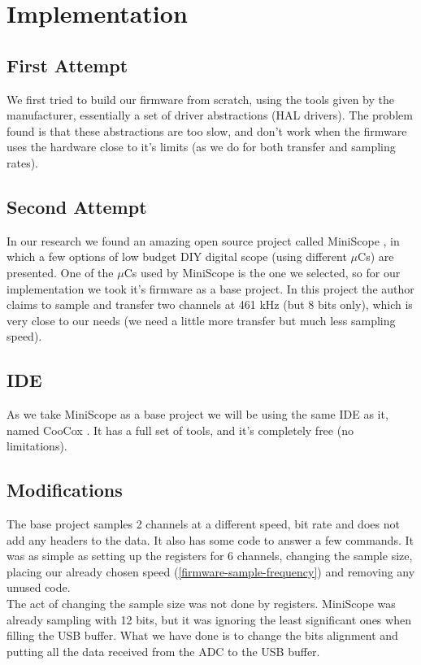 \chapter{Implementation}
\label{firmware-implementation}

\section{First Attempt}
We first tried to build our firmware from scratch, using the tools given by the
manufacturer, essentially a set of driver abstractions (HAL drivers). The problem
found is that these abstractions are too slow, and don't work when the firmware
uses the hardware close to it's limits (as we do for both transfer and sampling rates).

\section{Second Attempt}
In our research we found an amazing open source project called MiniScope \cite{MiniScope},
in which a few options of low budget DIY digital scope (using different $\mu$Cs) are
presented. One of the $\mu$Cs used by MiniScope is the one we selected, so for our
implementation we took it's firmware as a base project. In this project the author
claims to sample and transfer two channels at 461 kHz (but 8 bits only), which is
very close to our needs (we need a little more transfer but much less sampling speed).

\section{IDE}
As we take MiniScope as a base project we will be using the same IDE as it, named
CooCox \cite{CooCox}. It has a full set of tools, and it's completely free (no limitations).

\section{Modifications}
The base project samples 2 channels at a different speed, bit rate and does not
add any headers to the data. It also has some code to answer a few commands. It
was as simple as setting up the registers for 6 channels, changing the sample size,
placing our already chosen speed (\autoref{firmware-sample-frequency}) and removing
any unused code. \\
The act of changing the sample size was not done by registers. MiniScope was already
sampling with 12 bits, but it was ignoring the least significant ones when filling
the USB buffer. What we have done is to change the bits alignment and putting all
the data received from the ADC to the USB buffer.

